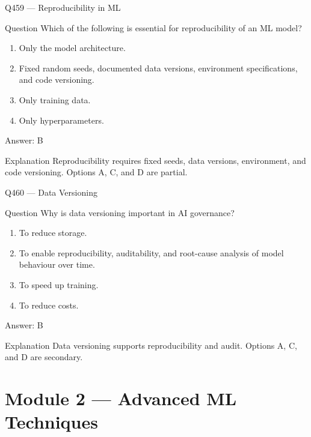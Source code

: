 \documentclass[aspectratio=169,8pt]{beamer}
\begin{document}
	\begin{frame}{Q459 --- Reproducibility in ML}
		\begin{block}{Question}
			Which of the following is essential for reproducibility of an ML model?
			\begin{enumerate}
				\item Only the model architecture.
				\item Fixed random seeds, documented data versions, environment specifications, and code versioning.
				\item Only training data.
				\item Only hyperparameters.
			\end{enumerate}
		\end{block}
		\begin{exampleblock}{Answer: B}\end{exampleblock}
		\begin{block}{Explanation}
			Reproducibility requires fixed seeds, data versions, environment, and code versioning. Options A, C, and D are partial.
		\end{block}
	\end{frame}
	
	\begin{frame}{Q460 --- Data Versioning}
		\begin{block}{Question}
			Why is data versioning important in AI governance?
			\begin{enumerate}
				\item To reduce storage.
				\item To enable reproducibility, auditability, and root-cause analysis of model behaviour over time.
				\item To speed up training.
				\item To reduce costs.
			\end{enumerate}
		\end{block}
		\begin{exampleblock}{Answer: B}\end{exampleblock}
		\begin{block}{Explanation}
			Data versioning supports reproducibility and audit. Options A, C, and D are secondary.
		\end{block}
	\end{frame}
	
	\section{Module 2 --- Advanced ML Techniques}
	
\end{document}
